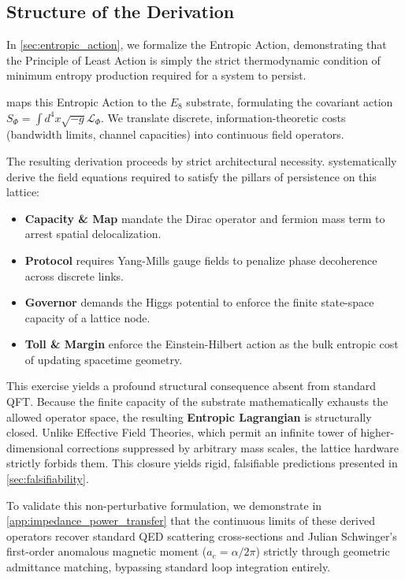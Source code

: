 \subsection{Structure of the Derivation}
In \cref{sec:entropic_action}, we formalize the Entropic Action, demonstrating that the Principle of Least Action is simply the strict thermodynamic condition of minimum entropy production required for a system to persist.

 maps this Entropic Action to the $E_8$ substrate, formulating the covariant action $S_\Phi = \int d^4x \sqrt{-g} \mathcal{L}_\Phi$. We translate discrete, information-theoretic costs (bandwidth limits, channel capacities) into continuous field operators. 

The resulting derivation proceeds by strict architectural necessity.  systematically derive the field equations required to satisfy the pillars of persistence on this lattice:
\begin{itemize}
    \item \textbf{Capacity \& Map} mandate the Dirac operator and fermion mass term to arrest spatial delocalization.
    \item \textbf{Protocol} requires Yang-Mills gauge fields to penalize phase decoherence across discrete links.
    \item \textbf{Governor} demands the Higgs potential to enforce the finite state-space capacity of a lattice node.
    \item \textbf{Toll \& Margin} enforce the Einstein-Hilbert action as the bulk entropic cost of updating spacetime geometry.
\end{itemize}

This exercise yields a profound structural consequence absent from standard QFT. Because the finite capacity of the substrate mathematically exhausts the allowed operator space, the resulting \textbf{Entropic Lagrangian} is structurally closed. Unlike Effective Field Theories, which permit an infinite tower of higher-dimensional corrections suppressed by arbitrary mass scales, the lattice hardware strictly forbids them. This closure yields rigid, falsifiable predictions presented in \cref{sec:falsifiability}.


To validate this non-perturbative formulation, we demonstrate in \cref{app:impedance_power_transfer} that the continuous limits of these derived operators recover standard QED scattering cross-sections and Julian Schwinger’s first-order anomalous magnetic moment ($a_e = \alpha/2\pi$) strictly through geometric admittance matching, bypassing standard loop integration entirely.

